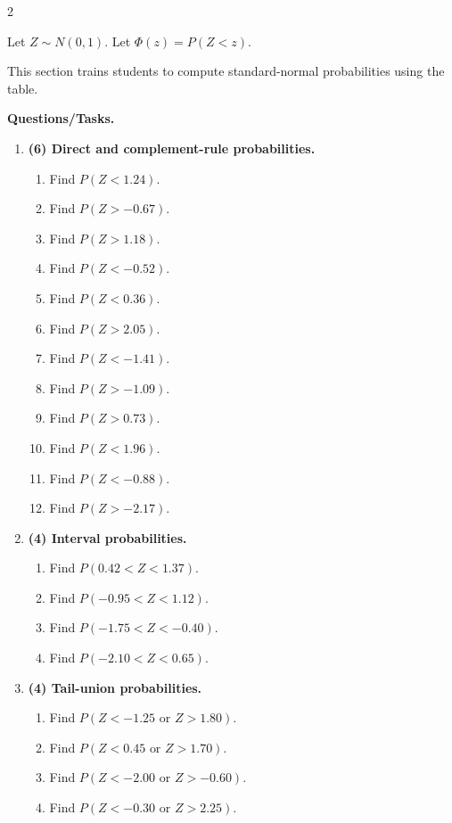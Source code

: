 \begin{multicols}{2}

\vspace{-0.25cm}

Let \(Z\sim N(0,1)\). Let \(\Phi(z)=P(Z<z)\).

This section trains students to compute standard-normal probabilities using the table.

\textbf{Questions/Tasks.}
\begin{enumerate}[label=\textbf{\arabic*)}]
    \item \textbf{(6) Direct and complement-rule probabilities.}
    \begin{enumerate}[label=\textbf{\alph*)}]
        \item Find \(P(Z<1.24)\).
        \item Find \(P(Z>-0.67)\).
        \item Find \(P(Z>1.18)\).
        \item Find \(P(Z<-0.52)\).
        \item Find \(P(Z<0.36)\).
        \item Find \(P(Z>2.05)\).
        \item Find \(P(Z<-1.41)\).
        \item Find \(P(Z>-1.09)\).
        \item Find \(P(Z>0.73)\).
        \item Find \(P(Z<1.96)\).
        \item Find \(P(Z<-0.88)\).
        \item Find \(P(Z>-2.17)\).
    \end{enumerate}

    \item \textbf{(4) Interval probabilities.}
    \begin{enumerate}[label=\textbf{\alph*)}]
        \item Find \(P(0.42<Z<1.37)\).
        \item Find \(P(-0.95<Z<1.12)\).
        \item Find \(P(-1.75<Z<-0.40)\).
        \item Find \(P(-2.10<Z<0.65)\).
    \end{enumerate}

    \item \textbf{(4) Tail-union probabilities.}
    \begin{enumerate}[label=\textbf{\alph*)}]
        \item Find \(P(Z<-1.25\text{ or }Z>1.80)\).
        \item Find \(P(Z<0.45\text{ or }Z>1.70)\).
        \item Find \(P(Z<-2.00\text{ or }Z>-0.60)\).
        \item Find \(P(Z<-0.30\text{ or }Z>2.25)\).
    \end{enumerate}
\end{enumerate}


\end{multicols}
